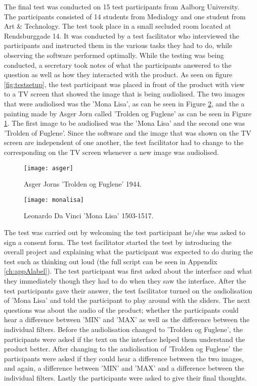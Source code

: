 The final test was conducted on 15 test participants from Aalborg University. The participants consisted of 14 students from Medialogy and one student from Art \& Technology. The test took place in a small secluded room located at Rendsburggade 14. It was conducted by a test facilitator who interviewed the participants and instructed them in the various tasks they had to do, while observing the software performed optimally. While the testing was being conducted, a secretary took notes of what the participants answered to the question as well as how they interacted with the product.
As seen on figure \ref{fig:testsetup}, the test participant was placed in front of the product with view to a TV screen that showed the image that is being audiolised. The two images that were audiolised was the 'Mona Lisa', as can be seen in Figure \ref{fig:monalisa}, and the a painting made by Asger Jorn called 'Trolden og Fuglene' as can be seen in Figure \ref{fig:asger}. The first image to be audiolised was the 'Mona Lisa' and the second one was 'Trolden of Fuglene'. Since the software and the image that was shown on the TV screen are independent of one another, the test facilitator had to change to the corresponding on the TV screen whenever a new image was audiolised.

\begin{figure}[!h] 
\centering
\texttt{[image: asger]}
\caption{\label{fig:asger} Asger Jorns 'Trolden og Fuglene' 1944.}
\end{figure}

\begin{figure}[!h] 
\centering
\texttt{[image: monalisa]}
\caption{\label{fig:monalisa} Leonardo Da Vinci 'Mona Lisa' 1503-1517.}
\end{figure}

The test was carried out by welcoming the test participant he/she was asked to sign a consent form. The test facilitator started the test by introducing the overall project and explaining what the participant was expected to do during the test such as thinking out loud (the full script can be seen in Appendix \ref{ch:appAlabel}). The test participant was first asked about the interface and what they immediately though they had to do when they saw the interface. After the test participants gave their answer, the test facilitator turned on the audiolisation of 'Mona Lisa' and told the participant to play around with the sliders. The next questions was about the audio of the product; whether the participants could hear a difference between 'MIN' and 'MAX' as well as the difference between the individual filters. Before the audiolisation changed to 'Trolden og Fuglene', the participants were asked if the text on the interface helped them understand the product better. 
After changing to the audiolisation of 'Trolden og Fuglene' the participants were asked if they could hear a difference between the two images, and again, a difference between 'MIN' and 'MAX' and a difference between the individual filters. Lastly the participants were asked to give their final thoughts.

